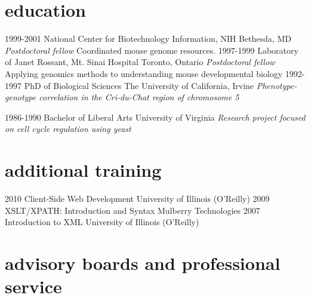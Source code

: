 \documentclass[]{dmc-cv} %
\begin{document}
\section{education}

\begin{entrylist}
\entry
{1999-2001}
{National Center for Biotechnology Information, NIH}
{Bethesda, MD}
{\emph{Postdoctoral fellow}
Coordinated mouse genome resources.
}
\entry
{1997-1999}
{Laboratory of Janet Rossant, Mt. Sinai Hospital}
{Toronto, Ontario}
{\emph{Postdoctoral fellow}
Applying genomics methods to understanding mouse developmental biology
}
\entry
{1992-1997}
{PhD {\normalfont of Biological Sciences}}
{The University of California, Irvine}
{\emph{Phenotype-genotype correlation in the Cri-du-Chat region of chromosome 5}
}

\entry
{1986-1990}
{Bachelor {\normalfont of Liberal Arts}}
{University of Virginia}
{\emph{Research project focused on cell cycle regulation using yeast}
}
\end{entrylist}


\section{additional training}

\begin{entrylist}
\smallentry
{2010}
{Client-Side Web Development}
{University of Illinois (O'Reilly)}
\smallentry
{2009}
{XSLT/XPATH: Introduction and Syntax}
{Mulberry Technologies}
\smallentry
{2007}
{Introduction to XML}
{University of Illinois (O'Reilly)}
\end{entrylist}


\section{advisory boards and professional service}
\end{document}
